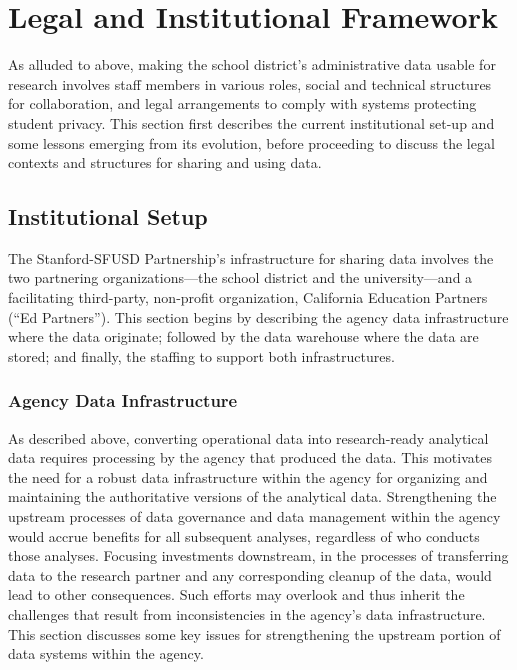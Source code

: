 \hypertarget{legal-and-institutional-framework-4}{%
\section{Legal and Institutional Framework}\label{legal-and-institutional-framework-4}}

As alluded to above, making the school district's administrative data usable for research involves staff members in various roles, social and technical structures for collaboration, and legal arrangements to comply with systems protecting student privacy. This section first describes the current institutional set-up and some lessons emerging from its evolution, before proceeding to discuss the legal contexts and structures for sharing and using data.

\hypertarget{institutional-setup-4}{%
\subsection{Institutional Setup}\label{institutional-setup-4}}

The Stanford-SFUSD Partnership's infrastructure for sharing data involves the two partnering organizations---the school district and the university---and a facilitating third-party, non-profit organization, California Education Partners (``Ed Partners''). This section begins by describing the agency data infrastructure where the data originate; followed by the data warehouse where the data are stored; and finally, the staffing to support both infrastructures.

\hypertarget{agency-data-infrastructure}{%
\subsubsection{Agency Data Infrastructure}\label{agency-data-infrastructure}}

As described above, converting operational data into research-ready analytical data requires processing by the agency that produced the data. This motivates the need for a robust data infrastructure within the agency for organizing and maintaining the authoritative versions of the analytical data. Strengthening the upstream processes of data governance and data management within the agency would accrue benefits for all subsequent analyses, regardless of who conducts those analyses. Focusing investments downstream, in the processes of transferring data to the research partner and any corresponding cleanup of the data, would lead to other consequences. Such efforts may overlook and thus inherit the challenges that result from inconsistencies in the agency's data infrastructure. This section discusses some key issues for strengthening the upstream portion of data systems within the agency.

